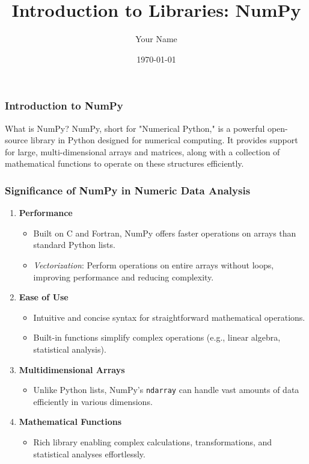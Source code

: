 \documentclass{beamer}
\title{Introduction to Libraries: NumPy}
\author{Your Name}
\institute{Your Institution}
\date{\today}
\begin{document}
\frame{\titlepage}

\begin{frame}[fragile]
    \frametitle{Introduction to NumPy}
    \begin{block}{What is NumPy?}
        NumPy, short for "Numerical Python," is a powerful open-source library in Python designed for numerical computing. 
        It provides support for large, multi-dimensional arrays and matrices, along with a collection of mathematical functions to operate on these structures efficiently.
    \end{block}
\end{frame}

\begin{frame}[fragile]
    \frametitle{Significance of NumPy in Numeric Data Analysis}
    \begin{enumerate}
        \item \textbf{Performance}
        \begin{itemize}
            \item Built on C and Fortran, NumPy offers faster operations on arrays than standard Python lists.
            \item \textit{Vectorization}: Perform operations on entire arrays without loops, improving performance and reducing complexity.
        \end{itemize}
        
        \item \textbf{Ease of Use}
        \begin{itemize}
            \item Intuitive and concise syntax for straightforward mathematical operations.
            \item Built-in functions simplify complex operations (e.g., linear algebra, statistical analysis).
        \end{itemize}
        
        \item \textbf{Multidimensional Arrays}
        \begin{itemize}
            \item Unlike Python lists, NumPy’s \texttt{ndarray} can handle vast amounts of data efficiently in various dimensions.
        \end{itemize}
        
        \item \textbf{Mathematical Functions}
        \begin{itemize}
            \item Rich library enabling complex calculations, transformations, and statistical analyses effortlessly.
        \end{itemize}
    \end{enumerate}
\end{frame}
\end{document}
